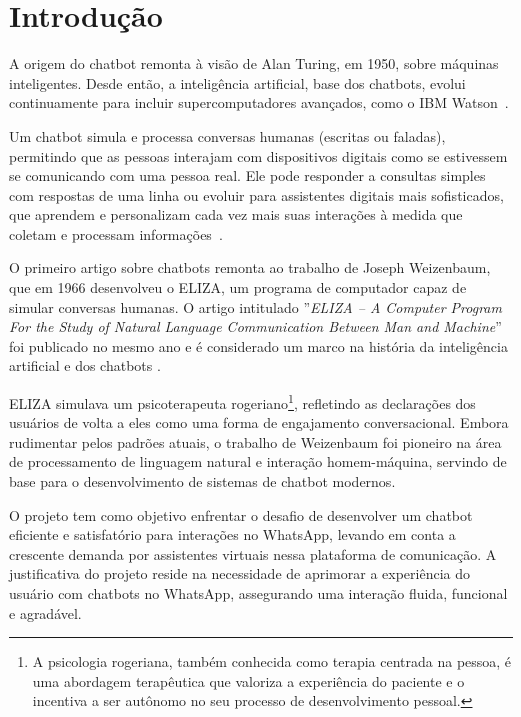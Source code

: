 \chapter{Introdução}
A origem do chatbot remonta à visão de Alan Turing, em 1950, sobre máquinas inteligentes. Desde então, a inteligência artificial, base dos chatbots, evolui continuamente para incluir supercomputadores avançados, como o IBM Watson~\cite{TURING:1950,IBM2024}.

Um chatbot simula e processa conversas humanas (escritas ou faladas), permitindo que as pessoas interajam com dispositivos digitais como se estivessem se comunicando com uma pessoa real. Ele pode responder a consultas simples com respostas de uma linha ou evoluir para assistentes digitais mais sofisticados, que aprendem e personalizam cada vez mais suas interações à medida que coletam e processam informações~\cite{Oracle2024}.

O primeiro artigo sobre chatbots remonta ao trabalho de Joseph Weizenbaum, que em 1966 desenvolveu o ELIZA, um programa de computador capaz de simular conversas humanas. O artigo intitulado ''\textit{ELIZA – A Computer Program For the Study of Natural Language Communication Between Man and Machine}'' foi publicado no mesmo ano e é considerado um marco na história da inteligência artificial e dos chatbots \cite{Weizenbaum_1966}.

ELIZA simulava um psicoterapeuta rogeriano\footnote{A psicologia rogeriana, também conhecida como terapia centrada na pessoa, é uma abordagem terapêutica que valoriza a experiência do paciente e o incentiva a ser autônomo no seu processo de desenvolvimento pessoal.}, refletindo as declarações dos usuários de volta a eles como uma forma de engajamento conversacional. Embora rudimentar pelos padrões atuais, o trabalho de Weizenbaum foi pioneiro na área de processamento de linguagem natural e interação homem-máquina, servindo de base para o desenvolvimento de sistemas de chatbot modernos.

O projeto tem como objetivo enfrentar o desafio de desenvolver um chatbot eficiente e satisfatório para interações no WhatsApp, levando em conta a crescente demanda por assistentes virtuais nessa plataforma de comunicação. A justificativa do projeto reside na necessidade de aprimorar a experiência do usuário com chatbots no WhatsApp, assegurando uma interação fluida, funcional e agradável.

